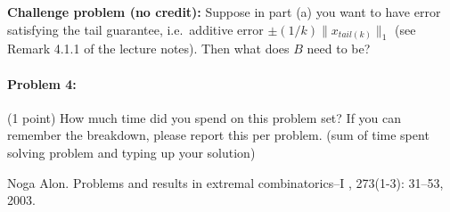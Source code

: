 \documentclass[12pt]{article}
\begin{document}
\noindent \textbf{Challenge problem (no credit):} Suppose in part (a) you want to have error satisfying the tail guarantee, i.e.\ additive error $\pm (1/k)\|x_{tail(k)}\|_1$ (see Remark 4.1.1 of the lecture notes). Then what does $B$ need to be?

\paragraph{Problem 4:} (1 point) How much time did you spend on this problem set? If you can remember the breakdown, please report this per problem. (sum of time spent solving problem and typing up your solution)



\begin{thebibliography}{42}

Noga Alon.
\newblock Problems and results in extremal combinatorics--I
, 273(1-3): 31--53, 2003.

\end{thebibliography}
\end{document}
